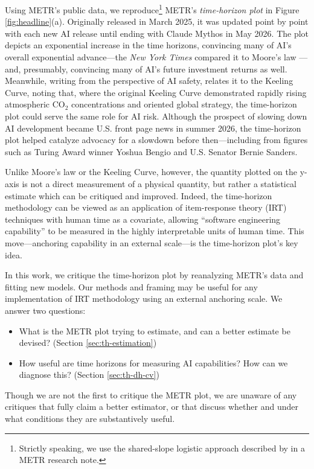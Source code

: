 \documentclass{article}
\theoremstyle{definition}
\begin{document}
Using METR's public data, we reproduce\footnote{Strictly speaking, we use the shared-slope logistic approach described by \citet{ImpactModellingAssumptions2026} in a METR research note.} METR's \emph{time-horizon plot} in Figure \ref{fig:headline}(a). Originally released in March 2025, it was updated point by point with each new AI release until ending with Claude Mythos in May 2026. The plot depicts an exponential increase in the time horizons, convincing many of AI's overall exponential advance---the \emph{New York Times} compared it to Moore's law \citep{rooseHowYouMeasure2026}---and, presumably, convincing many of AI's future investment returns as well. Meanwhile, writing from the perspective of AI safety, \citet{BuildingTechnologyDrive2026} relates it to the Keeling Curve, noting that, where the original Keeling Curve demonstrated rapidly rising atmospheric CO$_2$ concentrations and oriented global strategy, the time-horizon plot could serve the same role for AI risk. Although the prospect of slowing down AI development became U.S. front page news in summer 2026, the time-horizon plot helped catalyze advocacy for a slowdown before then---including from figures such as Turing Award winner Yoshua Bengio and U.S. Senator Bernie Sanders. 



Unlike Moore's law or the Keeling Curve, however, the quantity plotted on the y-axis is not a direct measurement of a physical quantity, but rather a statistical estimate which can be critiqued and improved. Indeed, the time-horizon methodology can be viewed as an application of item-response theory (IRT) techniques with human time as a covariate, allowing ``software engineering capability'' to be measured in the highly interpretable units of human time. This move---anchoring capability in an external scale---is the time-horizon plot's key idea.

In this work, we critique the time-horizon plot by reanalyzing METR's data and fitting new models. Our methods and framing may be useful for any implementation of IRT methodology using an external anchoring scale. We answer two questions:
\begin{itemize}
    \item What is the METR plot trying to estimate, and can a better estimate be devised? (Section \ref{sec:th-estimation})
    \item How useful are time horizons for measuring AI capabilities? How can we diagnose this? (Section \ref{sec:th-dh-cv}) 
\end{itemize}
Though we are not the first to critique the METR plot, we are unaware of any critiques that fully claim a better estimator, or that discuss whether and under what conditions they are substantively useful. 
\end{document}
